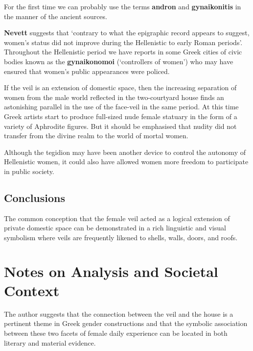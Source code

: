 \begin{rmk}
    For the first time we can probably use the terms \textbf{andron} and \textbf{gynaikonitis} in the manner of the ancient sources.
\end{rmk}

\textbf{Nevett} suggests that `contrary to what the epigraphic record appears to suggest, women's status did not improve during the Hellenistic to early Roman periods'. Throughout the Hellenistic period we have reports in some Greek cities of civic bodies known as the \textbf{gynaikonomoi} (`controllers of women') who may have ensured that women's public appearances were policed.

If the veil is an extension of domestic space, then the increasing separation of women from the male world reflected in the two-courtyard house finds an astonishing parallel in the use of the face-veil in the same period. At this time Greek artists start to produce full-sized nude female statuary in the form of a variety of Aphrodite figures. But it should be emphasised that nudity did not transfer from the divine realm to the world of mortal women.

\begin{rmk}
    Although the tegidion may have been another device to control the autonomy of Hellenistic women, it could also have allowed women more freedom to participate in public society.
\end{rmk}



\subsection{Conclusions}

The common conception that the female veil acted as a logical extension of private domestic space can be demonstrated in a rich linguistic and visual symbolism where veils are frequently likened to shells, walls, doors, and roofs.


\section{Notes on Analysis and Societal Context}
\label{sec:SocCont9}

The author suggests that the connection between the veil and the house is a pertinent theme in Greek gender constructions and that the symbolic association between these two facets of female daily experience can be located in both literary and material evidence.


